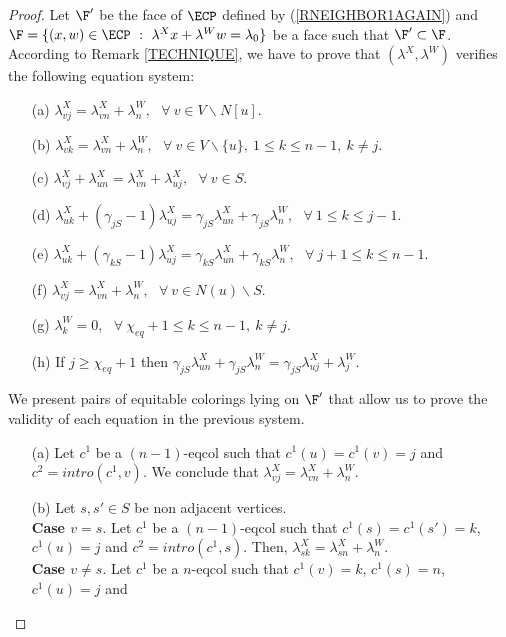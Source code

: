 \begin{proof}
Let $\F'$ be the face of $\ECP$ defined by (\ref{RNEIGHBOR1AGAIN}) and
$\F = \{ (x,w) \in \ECP ~:~ \lambda^X x + \lambda^W w = \lambda_0\}$ be a face such that $\F' \subset \F$.
According to Remark \ref{TECHNIQUE}, we have to prove that $(\lambda^X, \lambda^W)$ verifies the following equation system: 
\begin{enumerate}
\item[(a)] $\lambda^X_{vj} = \lambda^X_{vn} + \lambda^W_n,~~~ \forall~ v \in V \backslash N[u]$.
\item[(b)] $\lambda^X_{vk} = \lambda^X_{vn} + \lambda^W_n,~~~
	      \forall~ v \in V \backslash \{u\},~ 1 \leq k \leq n-1,~ k \neq j$.
\item[(c)] $\lambda^X_{vj} + \lambda^X_{un} = \lambda^X_{vn} + \lambda^X_{uj},~~~
	      \forall~ v \in S$.
\item[(d)] $\lambda^X_{uk} + (\gamma_{jS} - 1) \lambda^X_{uj} = \gamma_{jS} \lambda^X_{un}
              + \gamma_{jS} \lambda^W_n,~~~ \forall~ 1 \leq k \leq j-1$.
\item[(e)] $\lambda^X_{uk} + (\gamma_{kS} - 1) \lambda^X_{uj} =
	    \gamma_{kS} \lambda^X_{un} + \gamma_{kS} \lambda^W_n,~~~
	      \forall~ j+1 \leq k \leq n-1$.
\item[(f)] $\lambda^X_{vj} = \lambda^X_{vn} + \lambda^W_n,~~~ \forall~ v \in N(u) \backslash S$.
\item[(g)] $\lambda^W_k = 0,~~~ \forall~ \chi_{eq} + 1 \leq k \leq n-1,~ k \neq j$.
\item[(h)] If $j \geq \chi_{eq} + 1$ then
           $\gamma_{jS} \lambda^X_{un} + \gamma_{jS} \lambda^W_n = \gamma_{jS} \lambda^X_{uj} + \lambda^W_j$.
\end{enumerate}
We present pairs of equitable colorings lying on $\F'$ that allow us to
prove the validity of each equation in the previous system.
\begin{enumerate}
\item[(a)] Let $c^1$ be a $(n-1)$-eqcol such that $c^1(u) = c^1(v) = j$ and $c^2 = intro(c^1,v)$. We conclude that
$\lambda^X_{vj} = \lambda^X_{vn} + \lambda^W_n$. 
\item[(b)] Let $s, s' \in S$ be non adjacent vertices.\\
\textbf{Case $v = s$}. Let $c^1$ be a $(n-1)$-eqcol such that $c^1(s) = c^1(s') = k$, $c^1(u) = j$
and $c^2 = intro(c^1,s)$. Then, $\lambda^X_{sk} = \lambda^X_{sn} + \lambda^W_n$.\\
\textbf{Case $v \neq s$}. Let $c^1$ be a $n$-eqcol such that $c^1(v) = k$, $c^1(s) = n$, $c^1(u) = j$ and

\end{enumerate}
\end{proof}
